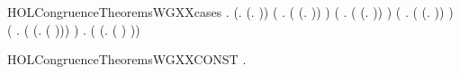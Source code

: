 \begin{SaveVerbatim}{HOLCongruenceTheoremsWGXXcases}
\HOLTokenTurnstile{} \HOLSymConst{\HOLTokenForall{}}.
         \HOLSymConst{\HOLTokenEquiv{}}
       (\HOLSymConst{\HOLTokenExists{}}.  \HOLSymConst{=} (\HOLTokenLambda{}. )) \HOLSymConst{\HOLTokenDisj{}}
       (\HOLSymConst{\HOLTokenExists{}} . ( \HOLSymConst{=} (\HOLTokenLambda{}.  )) \HOLSymConst{\HOLTokenConj{}}  ) \HOLSymConst{\HOLTokenDisj{}}
       (\HOLSymConst{\HOLTokenExists{}} . ( \HOLSymConst{=} (\HOLTokenLambda{}.   \HOLSymConst{\ensuremath{+}}  )) \HOLSymConst{\HOLTokenConj{}}   \HOLSymConst{\HOLTokenConj{}}  ) \HOLSymConst{\HOLTokenDisj{}}
       (\HOLSymConst{\HOLTokenExists{}} . ( \HOLSymConst{=} (\HOLTokenLambda{}.   \HOLSymConst{\ensuremath{\parallel}}  )) \HOLSymConst{\HOLTokenConj{}}   \HOLSymConst{\HOLTokenConj{}}  ) \HOLSymConst{\HOLTokenDisj{}}
       (\HOLSymConst{\HOLTokenExists{}} . ( \HOLSymConst{=} (\HOLTokenLambda{}. \HOLConst{\ensuremath{\nu}}  ( ))) \HOLSymConst{\HOLTokenConj{}}  ) \HOLSymConst{\HOLTokenDisj{}}
       \HOLSymConst{\HOLTokenExists{}} . ( \HOLSymConst{=} (\HOLTokenLambda{}.  ( ) )) \HOLSymConst{\HOLTokenConj{}}  
\end{SaveVerbatim}
\newcommand{\HOLCongruenceTheoremsWGXXcases}{\UseVerbatim{HOLCongruenceTheoremsWGXXcases}}
\begin{SaveVerbatim}{HOLCongruenceTheoremsWGXXCONST}
\HOLTokenTurnstile{} \HOLSymConst{\HOLTokenForall{}}.   \HOLSymConst{\HOLTokenImp{}}  
\end{SaveVerbatim}
